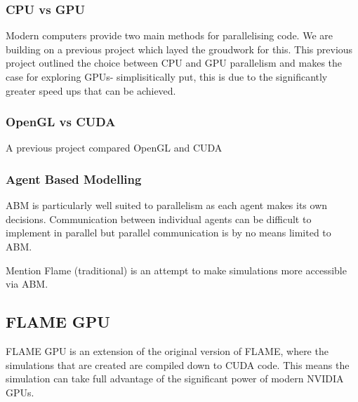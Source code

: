 \documentclass{UoYCSproject}
\begin{document}
\subsubsection{CPU vs GPU}
Modern computers provide two main methods for parallelising code.
We are building on a previous project\cite{phil_diss} which layed the groudwork for this.
This previous project outlined the choice between CPU and GPU parallelism and makes the case for exploring GPUs- simplisitically put, this is due to the significantly greater speed ups that can be achieved.




\subsubsection{OpenGL vs CUDA}
A previous project compared OpenGL and CUDA


\subsubsection{Agent Based Modelling}
ABM is particularly well suited to parallelism as each agent makes its own decisions.
Communication between individual agents can be difficult to implement in parallel but parallel communication is by no means limited to ABM.


Mention Flame (traditional) is an attempt to make simulations more accessible via ABM.

\subsection{FLAME GPU}
FLAME GPU is an extension of the original version of FLAME, where the simulations that are created are compiled down to CUDA code. This means the simulation can take full advantage of the significant power of modern NVIDIA GPUs.


\end{document}
